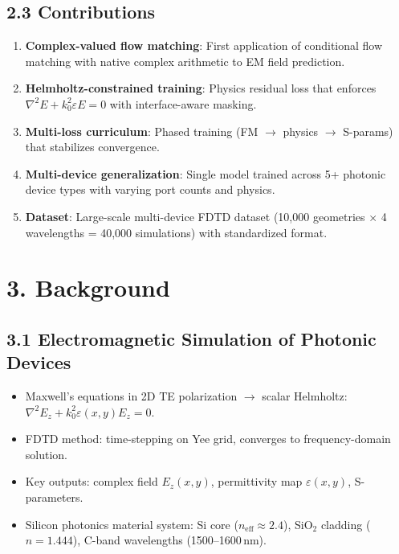 \documentclass[11pt,letterpaper]{article}
\begin{document}
\subsection{2.3 Contributions}
\begin{enumerate}
    \item \textbf{Complex-valued flow matching}: First application of conditional flow matching with native complex arithmetic to EM field prediction.
    \item \textbf{Helmholtz-constrained training}: Physics residual loss that enforces $\nabla^2 E + k_0^2 \varepsilon E = 0$ with interface-aware masking.
    \item \textbf{Multi-loss curriculum}: Phased training (FM $\to$ physics $\to$ S-params) that stabilizes convergence.
    \item \textbf{Multi-device generalization}: Single model trained across 5+ photonic device types with varying port counts and physics.
    \item \textbf{Dataset}: Large-scale multi-device FDTD dataset (10,000 geometries $\times$ 4 wavelengths = 40,000 simulations) with standardized format.
\end{enumerate}

\section{3. Background}

\subsection{3.1 Electromagnetic Simulation of Photonic Devices}
\begin{itemize}
    \item Maxwell's equations in 2D TE polarization $\to$ scalar Helmholtz: $\nabla^2 E_z + k_0^2 \varepsilon(x,y) E_z = 0$.
    \item FDTD method: time-stepping on Yee grid, converges to frequency-domain solution.
    \item Key outputs: complex field $E_z(x,y)$, permittivity map $\varepsilon(x,y)$, S-parameters.
    \item Silicon photonics material system: Si core ($n_\text{eff} \approx 2.4$), SiO$_2$ cladding ($n = 1.444$), C-band wavelengths (1500--1600\,nm).
\end{itemize}
\end{document}

